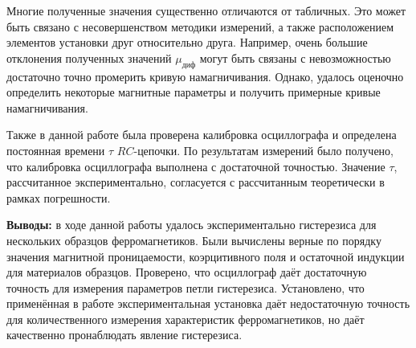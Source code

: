 \documentclass[a4paper, 12pt]{article}
\begin{document}
Многие полученные значения существенно отличаются от табличных. Это может быть связано с несовершенством методики измерений, а также расположением элементов установки друг относительно друга. Например, очень большие отклонения полученных значений $\mu_{диф}$ могут быть связаны с невозможностью достаточно точно промерить кривую намагничивания. Однако, удалось оценочно определить некоторые магнитные параметры и получить примерные кривые намагничивания.

Также в данной работе была проверена калибровка осциллографа и определена постоянная времени $\tau$ $RC$-цепочки. По результатам измерений было получено, что калибровка осциллографа выполнена с достаточной точностью. Значение $\tau$, рассчитанное экспериментально, согласуется с рассчитанным теоретически в рамках погрешности. 

\textbf{Выводы:} в ходе данной работы удалось экспериментально гистерезиса для нескольких образцов ферромагнетиков. Были вычислены верные по порядку значения магнитной проницаемости, коэрцитивного поля и остаточной индукции для материалов образцов. Проверено, что осциллограф даёт достаточную точность для измерения параметров петли гистерезиса. Установлено, что применённая в работе экспериментальная установка даёт недостаточную точность для количественного измерения характеристик ферромагнетиков, но даёт качественно пронаблюдать явление гистерезиса.
\end{document}
